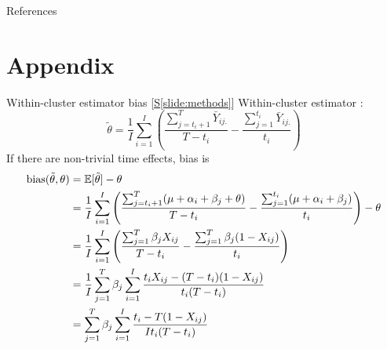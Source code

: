 \documentclass[9pt]{beamer}
\begin{document}



\addtocounter{framenumber}{-3}
\begin{frame}[allowframebreaks]{References}
\footnotesize


\end{frame}



\appendix

\addtocounter{framenumber}{-1}
\section{Appendix}



\addtocounter{framenumber}{-1}
\begin{frame}{Within-cluster estimator bias [\hyperlink{slide:methods}{S\ref{slide:methods}}]} \label{apx:withincluster}
Within-cluster estimator \citep{Hussey:2007}:
\[
\tilde{\theta} = \frac{1}{I}\sum_{i=1}^I\left(\frac{\sum_{j=t_i+1}^T\bar{Y}_{ij.}}{T-t_i} - \frac{\sum_{j=1}^{t_i}\bar{Y}_{ij.}}{t_i}\right)
\]
If there are non-trivial time effects, bias is
\begin{align*}
\mathrm{bias}(\tilde{\theta},\theta) &= \mathbb{E}[\tilde{\theta}] - \theta \\
&= \frac{1}{I}\sum_{i=1}^I\left(\frac{\sum_{j=t_i+1}^T(\mu+\alpha_i+\beta_j+\theta)}{T-t_i} - \frac{\sum_{j=1}^{t_i}(\mu+\alpha_i+\beta_j)}{t_i}\right) - \theta \\
&= \frac{1}{I}\sum_{i=1}^I\left(\frac{\sum_{j=1}^T\beta_jX_{ij}}{T-t_i} - \frac{\sum_{j=1}^T\beta_j(1-X_{ij})}{t_i}\right) \\
&= \frac{1}{I}\sum_{j=1}^T\beta_j\sum_{i=1}^I\frac{t_iX_{ij} - (T-t_i)(1-X_{ij})}{t_i(T-t_i)} \\
&= \sum_{j=1}^T\beta_j\sum_{i=1}^I\frac{t_i - T(1-X_{ij})}{It_i(T-t_i)}
\end{align*}
\end{frame}
\end{document}

